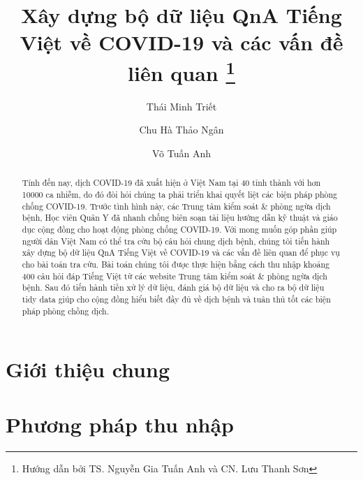 \documentclass[runningheads]{llncs}
\begin{document}
%
\title{Xây dựng bộ dữ liệu QnA Tiếng Việt về COVID-19 và các vấn đề liên quan \thanks{Hướng dẫn bởi TS. Nguyễn Gia Tuấn Anh và CN. Lưu Thanh Sơn}}
%
%
\author{Thái Minh Triết \and
Chu Hà Thảo Ngân \and
Võ Tuấn Anh}
%
%
%
\maketitle              %
%
\begin{abstract}
Tính đến nay, dịch COVID-19 đã xuất hiện ở Việt Nam tại 40 tỉnh thành với hơn 10000 ca nhiễm, do đó đòi hỏi chúng ta phải triển khai quyết liệt các biện pháp phòng chống COVID-19. Trước tình hình này, các Trung tâm kiểm soát \& phòng ngừa dịch bệnh, Học viên Quân Y đã nhanh chống biên soạn tài liệu hướng dẫn kỹ thuật và giáo dục cộng đồng cho hoạt động phòng chống COVID-19. Với mong muốn góp phần giúp người dân Việt Nam có thể tra cứu bộ câu hỏi chung dịch bệnh, chúng tôi tiến hành xây dựng bộ dữ liệu QnA Tiếng Việt về COVID-19 và các vấn đề liên quan để phục vụ cho bài toán tra cứu. Bài toán chúng tôi được thực hiện bằng cách thu nhập khoảng 400 câu hỏi đáp Tiếng Việt từ các website Trung tâm kiểm soát \& phòng ngừa dịch bệnh. Sau đó tiến hành tiền xử lý dữ liệu, đánh giá bộ dữ liệu và cho ra bộ dữ liệu tidy data giúp cho cộng đồng hiểu biết đầy đủ về dịch bệnh và tuân thủ tốt các biện pháp phòng chồng dịch.


\end{abstract}
%
%
%
\section{Giới thiệu chung}

\section{Phương pháp thu nhập}
\end{document}
